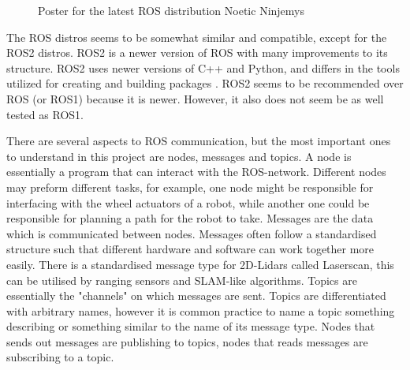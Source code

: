 \begin{figure}[H]
\centering

  \caption{Poster for the latest ROS distribution Noetic Ninjemys \cite{ROSLogo}}
  \label{fig:noeticLogo}
\end{figure}

The ROS distros seems to be somewhat similar and compatible, except for the ROS2 distros. ROS2 is a newer version of ROS with many improvements to its structure. ROS2 uses newer versions of C++ and Python, and differs in the tools utilized for creating and building packages \cite{ROSChanges}. ROS2 seems to be recommended over ROS (or ROS1) because it is newer. However, it also does not seem be as well tested as ROS1.

There are several aspects to ROS communication, but the most important ones to understand in this project are nodes, messages and topics. A node is essentially a program that can interact with the ROS-network. Different nodes may preform different tasks, for example, one node might be responsible for interfacing with the wheel actuators of a robot, while another one could be responsible for planning a path for the robot to take. Messages are the data which is communicated between nodes. Messages often follow a standardised structure such that different hardware and software can work together more easily. There is a standardised message type for 2D-Lidars called Laserscan, this can be utilised by ranging sensors and SLAM-like algorithms.  Topics are essentially the "channels" on which messages are sent. Topics are differentiated with arbitrary names, however it is common practice to name a topic something describing or something similar to the name of its message type. Nodes that sends out messages are publishing to topics, nodes that reads messages are subscribing to a topic. 